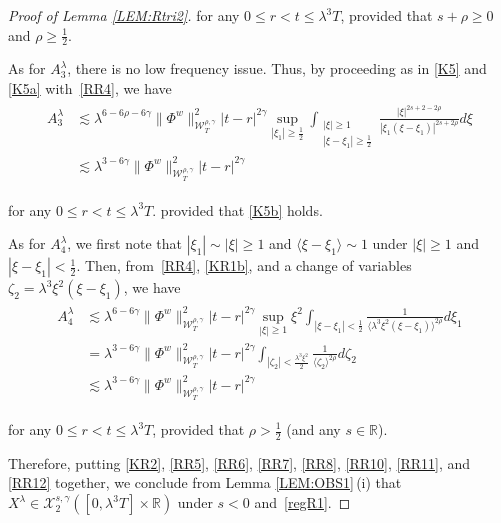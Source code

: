 \documentclass[letterpaper, 11pt,  reqno]{amsart}
\DeclareMathOperator*{\intt}{\int}
\newcommand{\1}{\hspace{0.5mm}\text{I}\hspace{0.5mm}}
\newcommand{\noi}{\noindent}
\newcommand{\R}{\mathbb{R}}
\newcommand{\g}{\gamma}
\newcommand{\ld}{\lambda}
\newcommand{\les}{\lesssim}
\newcommand{\jb}[1]
{\langle #1 \rangle}
\newcommand{\cX}{\mathcal{X}}
\newcommand{\W}{\mathcal{W}}
\newcommand{\z}{\zeta}
\numberwithin{equation}{section}
\numberwithin{theorem}{section}
\begin{document}
\begin{proof}[Proof of Lemma \ref{LEM:Rtri2}]
\noi
for any $0 \le r < t \le \ld^3T$, 
provided that $s + \rho \ge 0$
and $\rho \ge \frac 12$.






As for $A^\ld_3$, 
there is no low frequency issue.
Thus, by 
proceeding as in \eqref{K5} and \eqref{K5a} with~\eqref{RR4}, we have
\begin{align}
\begin{aligned}
A_3^\ld
& \les
\ld^{6 - 6\rho - 6\g}
\|\Phi^w\|^2_{\W_T^{\rho,\g}}|t-r |^{2\g}
\sup_{|\xi_1|\ge \frac 12}
\intt_{\substack{|\xi|\ge 1\\|\xi-\xi_1|\ge \frac 12 }} 
\frac{|\xi|^{2s+2-2\rho}}{|\xi_1(\xi - \xi_1)|^{2s+2\rho}} d\xi\\
& \les
\ld^{3 - 6\g}
\|\Phi^w\|^2_{\W_T^{\rho,\g}}|t-r |^{2\g}
\end{aligned}
\label{RR11}
\end{align}

\noi
for any $0 \le r <  t \le \ld^3T$.
provided that
\eqref{K5b} holds.

As for $A_4^\ld$, 
we first note that 
$ |\xi_1|\sim |\xi| \ge 1$
and $\jb{\xi - \xi_1}\sim 1$
under 
 $|\xi|\ge1$ and $|\xi - \xi_1|< \frac12 $.
 Then, from~\eqref{RR4}, \eqref{KR1b},  and a change of variables
 $\z_2  = \ld^3 \xi^2 (\xi - \xi_1)$, we have 
 \begin{align}
\begin{aligned}
A_4^\ld
&\les \ld^{6 - 6\g}
\|\Phi^w\|^2_{\W_T^{\rho,\g}}
|t-r |^{2\g }    \sup_{|\xi|\ge 1}  \xi^2
  \intt_{|\xi - \xi_1|< \frac 12} 
\frac{ 1}{  \jb{\ld^3 \xi^2(\xi - \xi_1)}^{2\rho}} d \xi_1\\
&= \ld^{3 - 6\g}
\|\Phi^w\|^2_{\W_T^{\rho,\g}}
|t-r |^{2\g }  
  \intt_{|\z_2|< \frac {\ld^3 \xi^2}2} 
 \frac{1}{\jb{\z_2}^{2\rho} }d \z_2\\
&  \les \ld^{3 - 6\g}\|\Phi^w\|^2_{\W_T^{\rho,\g}}
|t-r |^{2\g } 
\end{aligned}
\label{RR12}
\end{align}

\noi
for any $0 \le r <  t \le \ld^3T$, provided that $\rho > \frac 12$
(and any $s \in \R$).



Therefore, putting \eqref{KR2}, 
\eqref{RR5}, \eqref{RR6}, 
\eqref{RR7}, \eqref{RR8}, 
\eqref{RR10}, 
\eqref{RR11}, 
and \eqref{RR12}
together, we conclude 
from  Lemma \ref{LEM:OBS1}\,(i)
that 
 $X^\ld\in  \cX^{s, \g}_2([0, \ld^3 T]\times \R)$ under
 $s< 0$ and~\eqref{regR1}.
\end{proof}
\end{document}
